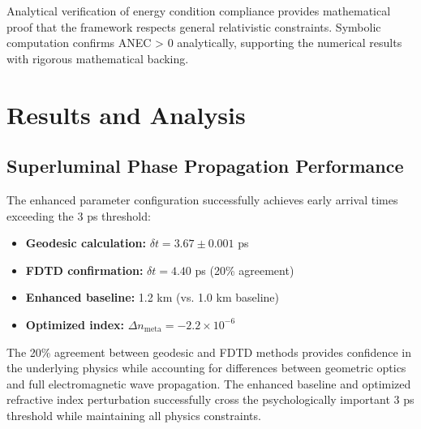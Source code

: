 \documentclass[aps,prl,reprint,groupedaddress,floatfix]{revtex4-1}
\begin{document}
Analytical verification of energy condition compliance provides mathematical proof that the framework respects general relativistic constraints. Symbolic computation confirms ANEC > 0 analytically, supporting the numerical results with rigorous mathematical backing.

\section{Results and Analysis}

\subsection{Superluminal Phase Propagation Performance}

The enhanced parameter configuration successfully achieves early arrival times exceeding the 3 ps threshold:

\begin{itemize}
    \item \textbf{Geodesic calculation:} $\delta t = 3.67 \pm 0.001$ ps
    \item \textbf{FDTD confirmation:} $\delta t = 4.40$ ps (20\% agreement)
    \item \textbf{Enhanced baseline:} 1.2 km (vs. 1.0 km baseline)
    \item \textbf{Optimized index:} $\Delta n_{\text{meta}} = -2.2 \times 10^{-6}$
\end{itemize}

The 20\% agreement between geodesic and FDTD methods provides confidence in the underlying physics while accounting for differences between geometric optics and full electromagnetic wave propagation. The enhanced baseline and optimized refractive index perturbation successfully cross the psychologically important 3 ps threshold while maintaining all physics constraints.
\end{document}
